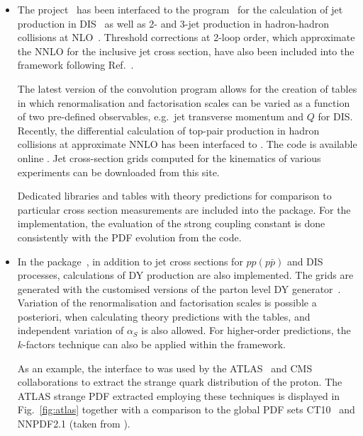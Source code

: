 \begin{itemize}
  \item The \fastnlo project~\cite{Kluge:2006xs} has been interfaced
    to the \nlojetpp program~\cite{Nagy:1998bb} for the calculation of
    jet production in DIS~\cite{Nagy:2001xb} as well as 2- and 3-jet
    production in hadron-hadron collisions at
    NLO~\cite{Nagy:2003tz,Nagy:2001fj}.  Threshold corrections at 2-loop
    order, which approximate the NNLO for the inclusive jet cross
    section, have also been included into the framework \cite{Wobisch:2011ij} 
    following Ref.~\cite{Kidonakis:2000gi}.
  
    The latest version of the \fastnlo convolution program \cite{Britzger:2012bs} allows for the
    creation of tables in which renormalisation and factorisation scales
    can be varied as a function of two pre-defined observables, e.g.\ jet
    transverse momentum \pperp and $Q$ for DIS\@. 
    Recently, the differential calculation of top-pair production in hadron collisions 
    at approximate NNLO \cite{Guzzi:2014wia} has been interfaced to \fastnlo \cite{dis2014Fast}.
    The \fastnlo code is available online \cite{fastNLO:HepForge}.
    Jet cross-section grids computed for the kinematics of various experiments
    can be downloaded from this site.

    Dedicated \fastnlo libraries and tables with theory predictions  for comparison to
    particular cross section measurements are included into the \fitter package. 
    For the \fitter implementation, the evaluation of the strong coupling constant is done
    consistently with the PDF evolution from the \qcdnum code. 

\item In the \applgrid package~\cite{Carli:2010rw,APPLGRID:HepForge},
    in addition to jet cross sections for
    $pp(p\bar p)$ and DIS processes, calculations 
    of DY production are also implemented. The grids are generated with
    the customised versions of the \mcfm parton level DY
    generator~\cite{Campbell:1999ah,Campbell:2000je,Campbell:2010ff}.
    Variation of the renormalisation and factorisation scales is possible a posteriori,
    when calculating theory predictions with the \applgrid  tables, and
    independent variation of $\alpha_S$ is also allowed.
    For higher-order predictions, the $k$-factors technique can also be applied
    within the \applgrid framework.

    As an example, the \fitter interface to \applgrid was used by the ATLAS~\cite{atlas:strange}
    and CMS~\cite{cms:strange} collaborations to extract the strange quark distribution of the proton.
    The ATLAS strange PDF extracted employing these techniques is displayed in
    Fig.~\ref{fig:atlas} together with a comparison to the global PDF
    sets CT10~\cite{CT10pdf} and NNPDF2.1 \cite{NNPDFpdf} (taken from \cite{atlas:strange}).


\end{itemize}
